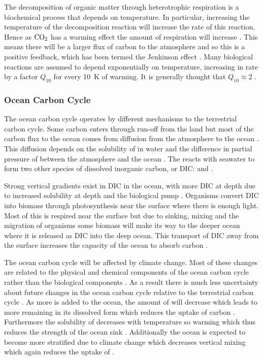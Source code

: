 The decomposition of organic matter through heterotrophic respiration is a biochemical process that depends on temperature. In particular, increasing the temperature of the decomposition reaction
will increase the rate of this reaction. Hence as $\ce{CO2}$ has a warming effect the amount of respiration will increase \parencite{Jenkinson1991}. 
This means there will be a larger flux of carbon to the atmosphere and so this is a positive feedback, which has been termed the Jenkinson effect \parencite{Luke2011}.
Many biological reactions are assumed to depend exponentially on temperature, increasing in rate by a factor $Q_{10}$ for every \SI{10}{\kelvin} of warming.
It is generally thought that $Q_{10} \approx 2$ \parencite{Jones2001}.

\subsubsection{Ocean Carbon Cycle}

The ocean carbon cycle operates by different mechanisms to the terrestrial carbon cycle. Some carbon enters through run-off from the land but most of the carbon flux to the ocean comes
from diffusion from the atmosphere to the ocean \parencite{Devries2022}. This diffusion depends on the solubility of  in water and
the difference in partial pressure of  between the atmosphere and the ocean \parencite{Wanninkhof1992}.
The  reacts with seawater to form two other species of dissolved inorganic carbon, or DIC:\@ {} and  \parencite{Dickson1987}.

Strong vertical gradients exist in DIC in the ocean, with more DIC at depth due to increased solubility at depth and the biological pump \parencite{Volk1985}. Organisms convert DIC into biomass
through photosynthesis near the surface where there is enough light. Most of this is respired near the surface but due to sinking, mixing and the migration of organisms some biomass
will make its way to the deeper ocean where it is released as DIC into the deep ocean. This transport of DIC away from the surface increases the capacity of the ocean to absorb carbon
\parencite{Sarmiento1984}.


The ocean carbon cycle will be affected by climate change. Most of these changes are related to the physical and
chemical components of the ocean carbon cycle rather than the biological components \parencite{AR6}. As a result there is much less uncertainty about future changes in the
ocean carbon cycle relative to the terrestrial carbon cycle \parencite{Arora2020}. As more  is added to the ocean, the amount of  will decrease which leads to
more  remaining in its dissolved form which reduces the uptake of carbon \parencite{Egleston2010}. Furthermore the solubility of  decreases with
temperature so warming which thus reduces the strength of the ocean sink \parencite{Weiss1974}. Additionally the ocean is expected to become more
stratified due to climate change which decreases vertical mixing which again reduces the uptake of  \parencite{DeVries2017}. 


